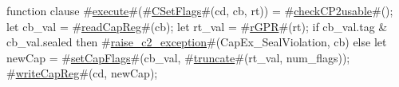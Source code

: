 function clause #\hyperref[zexecute]{execute}#(#\hyperref[zCSetFlags]{CSetFlags}#(cd, cb, rt)) = 
{
  #\hyperref[zcheckCP2usable]{checkCP2usable}#();
  let cb_val = #\hyperref[zreadCapReg]{readCapReg}#(cb);
  let rt_val = #\hyperref[zrGPR]{rGPR}#(rt);
  if cb_val.tag & cb_val.sealed then
    #\hyperref[zraisezyc2zyexception]{raise\_c2\_exception}#(CapEx_SealViolation, cb)
  else
  {
    let newCap  = #\hyperref[zsetCapFlags]{setCapFlags}#(cb_val, #\hyperref[ztruncate]{truncate}#(rt_val, num_flags));
    #\hyperref[zwriteCapReg]{writeCapReg}#(cd, newCap);
  }
}
